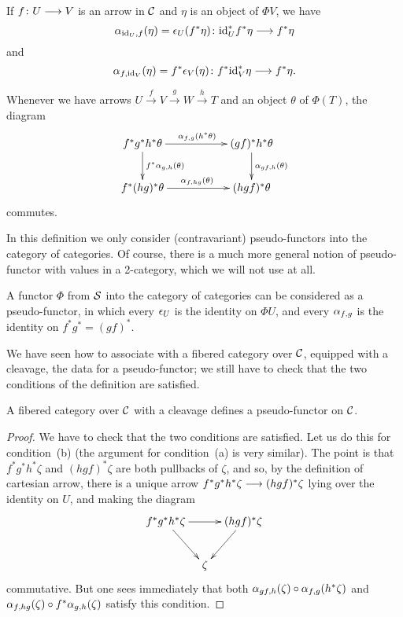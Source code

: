 \begin{3   FIBERED CATEGORIES}
\begin{3.1 Fibered categories}
\begin{definition}
\begin{enumeratea}

\item If $f \colon U \arr V$ is an arrow in $\mathcal{C}$ and $\eta$ is an object of $\Phi V$, we have
   \[
   \isoass_{\id_U, f}(\eta) = \isoiden_U (f^* \eta) \colon 
   \id_U^* f^* \eta \arr f^* \eta
   \]
and
   \[
    \isoass_{f, \id_V}(\eta) = f^*\isoiden_V (\eta) \colon 
   f^*\id_V^*  \eta \arr f^* \eta.
   \]

\item Whenever we have arrows $U \xrightarrow{f} V \xrightarrow{g} W \xrightarrow{h} T$ and an object $\theta$ of $\Phi(T)$, the diagram
   \[
   \xymatrix@C+30pt{
   f^*g^*h^* \theta \ar[r]^{\isoass_{f,g}(h^* \theta)}
   \ar[d]^{f^* \isoass_{g,h}(\theta)} &
   (gf)^*h^* \theta \ar[d]^{\isoass_{gf,h}(\theta)}\\
   f^*(hg)^* \theta \ar[r]^{\isoass_{f, hg}(\theta)}&
   (hgf)^* \theta
   }
   \]
commutes.
\end{enumeratea}
\end{definition}

In this definition we only consider (contravariant) pseudo-functors into the category of categories. Of course, there is a much more general notion of pseudo-functor with values in a 2-category, which we will not use at all.

A functor $\Phi$ from $\mathcal{S}$ into the category of categories can be considered as a pseudo-functor, in which every $\epsilon_U$ is the identity on $\Phi U$, and every $\alpha_{f,g}$ is the identity on $f^{*}g^{*} = (gf)^{*}$.

We have seen how to associate with a fibered category over $\mathcal{C}$, equipped with a cleavage, the data for a pseudo-functor; we still have to check that the two conditions of the definition are satisfied.

\begin{proposition}
A fibered category over $\mathcal{C}$ with a cleavage defines a pseudo-functor on $\mathcal{C}$.
\end{proposition}

\begin{proof}
We have to check that the two conditions are satisfied. Let us do this for condition~(b) (the argument for condition~(a) is very similar). The point is that $f^*g^*h^* \zeta$ and $(hgf)^* \zeta$ are both pullbacks of $\zeta$, and so, by the definition of cartesian arrow, there is a unique arrow $f^*g^*h^* \zeta \arr (hgf)^* \zeta$ lying over the identity on $U$, and making the diagram
   \[
   \xymatrix@C-15pt{
   f^*g^*h^* \zeta \ar[rr]\ar[rd] && (hgf)^* \zeta\ar[ld]\\
   &{}\zeta
   }
   \]
commutative. But one sees immediately that both $\alpha_{gf,h}(\zeta) \circ \alpha_{f,g}(h^* \zeta)$ and $\alpha_{f, hg}(\zeta) \circ f^* \alpha_{g,h}(\zeta)$ satisfy this condition.
\end{proof}


\end{3.1 Fibered categories}
\end{3   FIBERED CATEGORIES}
